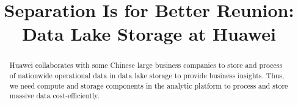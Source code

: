 \documentclass[sigconf, nonacm]{acmart}
\begin{document}
\title{Separation Is for Better Reunion: Data Lake Storage at Huawei}

\iffalse
\author{Ben Trovato}
\affiliation{%
  \institution{Institute for Clarity in Documentation}
  \streetaddress{P.O. Box 1212}
  \city{Dublin}
  \state{Ireland}
  \postcode{43017-6221}
}
\email{trovato@corporation.com}
\fi



\begin{abstract}
Huawei collaborates with some  Chinese large business companies to store and process  of nationwide operational data in data lake storage to provide business insights.  
  Thus, we need compute and storage components in the analytic platform  to process and store massive data cost-efficiently. 




 
 
 

\end{abstract}
\end{document}
